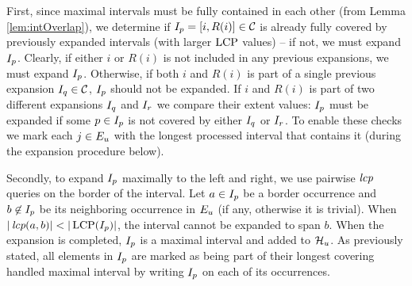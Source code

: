 First, since maximal intervals must be fully contained in each other (from Lemma \ref{lem:intOverlap}), we determine if $I_{p} = [i, R(i)] \in \mathcal{C}$ is already fully covered by previously expanded intervals (with larger $\operatorname{LCP}$ values) -- if not, we must expand $I_{p}$. Clearly, if either $i$ or $R(i)$ is not included in any previous expansions, we must expand $I_{p}$. Otherwise, if both $i$ and $R(i)$ is part of a single previous expansion $I_{q} \in \mathcal{C}$, $I_{p}$ should not be expanded. If $i$ and $R(i)$ is part of two different expansions $I_{q}$ and $I_{r}$ we compare their extent values: $I_{p}$ must be expanded if some $p \in I_{p}$ is not covered by either $I_{q}$ or $I_{r}$. To enable these checks we mark each $j \in E_{u}$ with the longest processed interval that contains it (during the expansion procedure below).

Secondly, to expand $I_{p}$ maximally to the left and right, we use pairwise $\operatorname{\textit{lcp}}$ queries on the border of the interval. Let $a \in I_{p}$ be a border occurrence and $b \not \in I_{p}$ be its neighboring occurrence in $E_{u}$ (if any, otherwise it is trivial). When $|\operatorname{\textit{lcp}}(a, b)| < |\operatorname{LCP}(I_{p})|$, the interval cannot be expanded to span $b$. When the expansion is completed, $I_{p}$ is a maximal interval and added to $\mathcal{H}_{u}$. As previously stated, all elements in $I_{p}$ are marked as being part of their longest covering handled maximal interval by writing $I_{p}$ on each of its occurrences.

